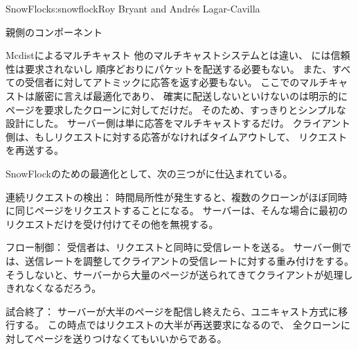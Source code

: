 \begin{aosachapter}{SnowFlock}{s:snowflock}{Roy Bryant and Andr\'e{s} Lagar-Cavilla}
\begin{aosasect1}{親側のコンポーネント}
\begin{aosasect2}{Mcdistによるマルチキャスト}
他のマルチキャストシステムとは違い、
には信頼性は要求されないし
順序どおりにパケットを配送する必要もない。
また、すべての受信者に対してアトミックに応答を返す必要もない。
ここでのマルチキャストは厳密に言えば最適化であり、
確実に配送しないといけないのは明示的にページを要求したクローンに対してだけだ。
そのため、すっきりとシンプルな設計にした。
サーバー側は単に応答をマルチキャストするだけ。
クライアント側は、もしリクエストに対する応答がなければタイムアウトして、
リクエストを再送する。

SnowFlockのための最適化として、次の三つがに仕込まれている。

\begin{aosaitemize}

  \item 連続リクエストの検出：
  時間局所性が発生すると、複数のクローンがほぼ同時に同じページをリクエストすることになる。
  サーバーは、そんな場合に最初のリクエストだけを受け付けてその他を無視する。

  \item フロー制御：
  受信者は、リクエストと同時に受信レートを送る。
  サーバー側では、送信レートを調整してクライアントの受信レートに対する重み付けをする。
  そうしないと、サーバーから大量のページが送られてきてクライアントが処理しきれなくなるだろう。

  \item 試合終了：
  サーバーが大半のページを配信し終えたら、ユニキャスト方式に移行する。
  この時点ではリクエストの大半が再送要求になるので、
  全クローンに対してページを送りつけなくてもいいからである。


\end{aosaitemize}
\end{aosasect2}
\end{aosasect1}
\end{aosachapter}
